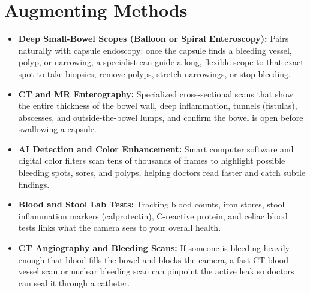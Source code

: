 \section{Augmenting Methods}
\begin{itemize}
    \item \textbf{Deep Small-Bowel Scopes (Balloon or Spiral Enteroscopy):} Pairs naturally with capsule endoscopy: once the capsule finds a bleeding vessel, polyp, or narrowing, a specialist can guide a long, flexible scope to that exact spot to take biopsies, remove polyps, stretch narrowings, or stop bleeding.
    \item \textbf{CT and MR Enterography:} Specialized cross-sectional scans that show the entire thickness of the bowel wall, deep inflammation, tunnels (fistulas), abscesses, and outside-the-bowel lumps, and confirm the bowel is open before swallowing a capsule.
    \item \textbf{AI Detection and Color Enhancement:} Smart computer software and digital color filters scan tens of thousands of frames to highlight possible bleeding spots, sores, and polyps, helping doctors read faster and catch subtle findings.
    \item \textbf{Blood and Stool Lab Tests:} Tracking blood counts, iron stores, stool inflammation markers (calprotectin), C-reactive protein, and celiac blood tests links what the camera sees to your overall health.
    \item \textbf{CT Angiography and Bleeding Scans:} If someone is bleeding heavily enough that blood fills the bowel and blocks the camera, a fast CT blood-vessel scan or nuclear bleeding scan can pinpoint the active leak so doctors can seal it through a catheter.
\end{itemize}

